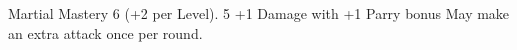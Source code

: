 \CreatePerk
  {Martial Mastery} %
  { 6 (+2 per Level). } %
  {5} %
  {+1 Damage with } %
  {+1 Parry bonus} %
  {May make an extra attack once per round.} %